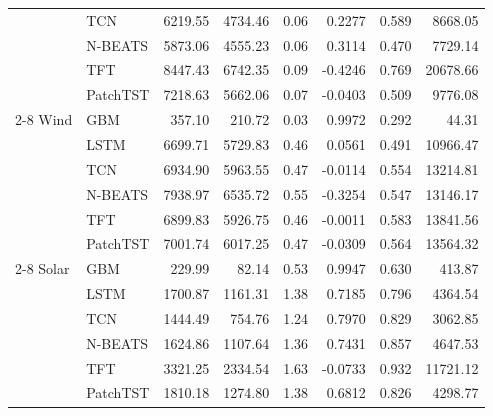 \begin{table}[htbp]
\begin{tabular}{llrrrrrr}
   & TCN & 6219.55 & 4734.46 & 0.06 & 0.2277 & 0.589 & 8668.05 \\
   & N-BEATS & 5873.06 & 4555.23 & 0.06 & 0.3114 & 0.470 & 7729.14 \\
   & TFT & 8447.43 & 6742.35 & 0.09 & -0.4246 & 0.769 & 20678.66 \\
   & PatchTST & 7218.63 & 5662.06 & 0.07 & -0.0403 & 0.509 & 9776.08 \\
\cmidrule(lr){2-8}
   Wind & GBM & 357.10 & 210.72 & 0.03 & 0.9972 & 0.292 & 44.31 \\
   & LSTM & 6699.71 & 5729.83 & 0.46 & 0.0561 & 0.491 & 10966.47 \\
   & TCN & 6934.90 & 5963.55 & 0.47 & -0.0114 & 0.554 & 13214.81 \\
   & N-BEATS & 7938.97 & 6535.72 & 0.55 & -0.3254 & 0.547 & 13146.17 \\
   & TFT & 6899.83 & 5926.75 & 0.46 & -0.0011 & 0.583 & 13841.56 \\
   & PatchTST & 7001.74 & 6017.25 & 0.47 & -0.0309 & 0.564 & 13564.32 \\
\cmidrule(lr){2-8}
   Solar & GBM & 229.99 & 82.14 & 0.53 & 0.9947 & 0.630 & 413.87 \\
   & LSTM & 1700.87 & 1161.31 & 1.38 & 0.7185 & 0.796 & 4364.54 \\
   & TCN & 1444.49 & 754.76 & 1.24 & 0.7970 & 0.829 & 3062.85 \\
   & N-BEATS & 1624.86 & 1107.64 & 1.36 & 0.7431 & 0.857 & 4647.53 \\
   & TFT & 3321.25 & 2334.54 & 1.63 & -0.0733 & 0.932 & 11721.12 \\
   & PatchTST & 1810.18 & 1274.80 & 1.38 & 0.6812 & 0.826 & 4298.77 \\
\bottomrule
\end{tabular}
\end{table}